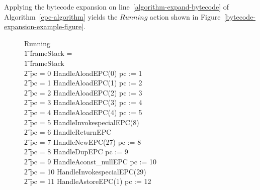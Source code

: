 Applying the bytecode expansion on
line~\ref{algorithm-expand-bytecode} of Algorithm~\ref{epc-algorithm}
yields the $Running$ action shown in
Figure~\ref{bytecode-expansion-example-figure}.
\begin{figure}[t]
  \setlength{\zedindent}{0cm}
  \setlength{\zedtab}{0.3cm}
  \setlength{\zedleftsep}{0.1cm}
  \begin{circus}
    Running \circdef \\
    \t1 \circif frameStack = \emptyset \circthen \Skip \\
    \t1 {} \circelse frameStack \neq \emptyset \circthen {} \\
    \t2 \circif pc = 0 \circthen HandleAloadEPC(0) \circseq pc := 1 \\
    \t2 {} \circelse pc = 1 \circthen HandleAloadEPC(1) \circseq pc := 2 \\
    \t2 {} \circelse pc = 2 \circthen HandleAloadEPC(2) \circseq pc := 3 \\
    \t2 {} \circelse pc = 3 \circthen HandleAloadEPC(3) \circseq pc := 4 \\
    \t2 {} \circelse pc = 4 \circthen HandleAloadEPC(4) \circseq pc := 5 \\
    \t2 {} \circelse pc = 5 \circthen HandleInvokespecialEPC(8) \\
    \t2 {} \circelse pc = 6 \circthen HandleReturnEPC \\
    \t2 {} \circelse pc = 7 \circthen HandleNewEPC(27) \circseq pc := 8 \\
    \t2 {} \circelse pc = 8 \circthen HandleDupEPC \circseq pc := 9 \\
    \t2 {} \circelse pc = 9 \circthen HandleAconst\_nullEPC \circseq pc := 10 \\
    \t2 {} \circelse pc = 10 \circthen HandleInvokespecialEPC(29) \\
    \t2 {} \circelse pc = 11 \circthen HandleAstoreEPC(1) \circseq pc := 12 \\

\end{circus}
\end{figure}
